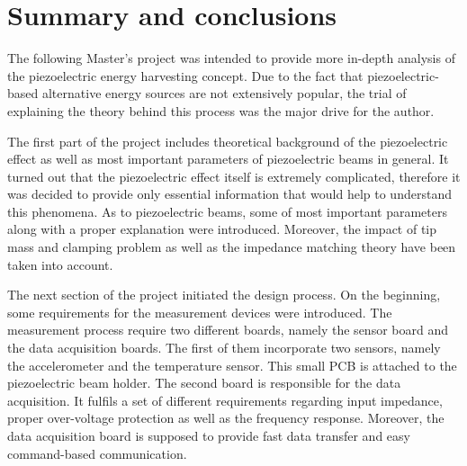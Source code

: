 \documentclass[12pt,a4paper]{article}
\begin{document}
\section{Summary and conclusions}
The following Master's project was intended to provide more in-depth analysis of the piezoelectric energy harvesting concept. Due to the fact that piezoelectric-based alternative energy sources are not extensively popular, the trial of explaining the theory behind this process was the major drive for the author.
\par
The first part of the project includes theoretical background of the piezoelectric effect as well as most important parameters of piezoelectric beams in general. It turned out that the piezoelectric effect itself is extremely complicated, therefore it was decided to provide only essential information that would help to understand this phenomena. As to piezoelectric beams, some of most important parameters along with a proper explanation were introduced. Moreover, the impact of tip mass and clamping problem as well as the impedance matching theory have been taken into account.
\par
The next section of the project initiated the design process. On the beginning, some requirements for the measurement devices were introduced. The measurement process require two different boards, namely the sensor board and the data acquisition boards. The first of them incorporate two sensors, namely the accelerometer and the temperature sensor. This small PCB is  attached to the piezoelectric beam holder. The second board is responsible for the data acquisition. It fulfils a set of different requirements regarding input impedance, proper over-voltage protection as well as the frequency response. Moreover, the data acquisition board is supposed to provide fast data transfer and easy command-based communication.
\par
\end{document}
